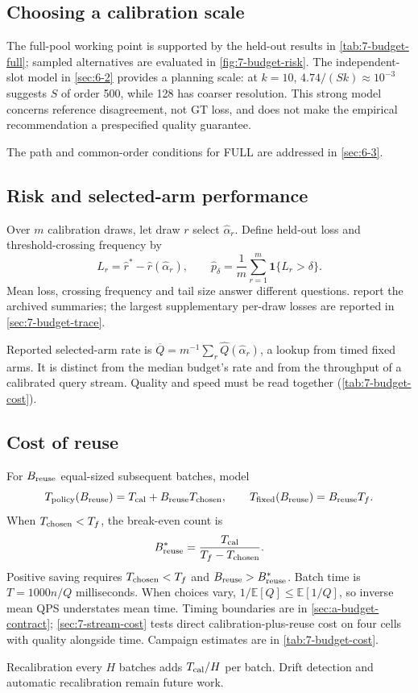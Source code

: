 \subsection{Choosing a calibration scale}

The full-pool working point is supported by the held-out results in
\cref{tab:7-budget-full}; sampled alternatives are evaluated in
\cref{fig:7-budget-risk}. The independent-slot model in \cref{sec:6-2}
provides a planning scale: at $k=10$, $4.74/(Sk)\approx10^{-3}$ suggests
$S$ of order 500, while 128 has coarser resolution. This strong model
concerns reference disagreement, not GT loss, and does not make the
empirical recommendation a prespecified quality guarantee.

The path and common-order conditions for FULL are addressed in
\cref{sec:6-3}.


\subsection{Risk and selected-arm performance}

Over $m$ calibration draws, let draw $r$ select $\widehat\alpha_r$.
Define held-out loss and threshold-crossing frequency by
\begin{equation}
 L_r=\widehat r^*-\widehat r(\widehat\alpha_r),\qquad
 \widehat p_\delta=\frac{1}{m}\sum_{r=1}^{m}\mathbf1\{L_r>\delta\}.
 \label{eq:6-risk}
\end{equation}
Mean loss, crossing frequency and tail size answer different questions.
 report the archived summaries;
the largest supplementary per-draw losses are reported in \cref{sec:7-budget-trace}.

Reported selected-arm rate is
$\overline Q=m^{-1}\sum_r\widehat Q(\widehat\alpha_r)$, a lookup from timed
fixed arms. It is distinct from the median budget's rate and from the
throughput of a calibrated query stream. Quality and speed must be read
together (\cref{tab:7-budget-cost}).

\subsection{Cost of reuse}

For $B_{\rm reuse}$ equal-sized subsequent batches, model
\begin{equation}
 T_{\rm policy}(B_{\rm reuse})=T_{\rm cal}+B_{\rm reuse}T_{\rm chosen},\qquad
 T_{\rm fixed}(B_{\rm reuse})=B_{\rm reuse}T_f.
 \label{eq:6-total-cost}
\end{equation}
When $T_{\rm chosen}<T_f$, the break-even count is
\begin{equation}
 B_{\rm reuse}^*=\frac{T_{\rm cal}}{T_f-T_{\rm chosen}}.
 \label{eq:6-payback}
\end{equation}
Positive saving requires $T_{\rm chosen}<T_f$ and
$B_{\rm reuse}>B_{\rm reuse}^*$. Batch time is $T=1000n/Q$ milliseconds.
When choices vary, $1/\mathbb E[Q]\leq\mathbb E[1/Q]$, so inverse mean
QPS understates mean time. Timing boundaries are in
\cref{sec:a-budget-contract}; \cref{sec:7-stream-cost} tests direct
calibration-plus-reuse cost on four cells with quality alongside time.
Campaign estimates are in \cref{tab:7-budget-cost}.

Recalibration every $H$ batches adds $T_{\rm cal}/H$ per batch.
Drift detection and automatic recalibration remain future work.

